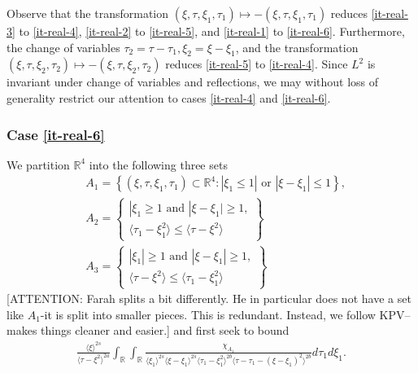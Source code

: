 \documentclass[12pt,reqno]{amsart}
\numberwithin{equation}{section}  %
\numberwithin{figure}{section}
\newcommand{\rr}{\mathbb{R}}
\theoremstyle{plain}
\theoremstyle{definition}
\theoremstyle{remark}
\begin{document}
%
%
Observe that the transformation $(\xi, \tau, \xi_{1}, \tau_{1}) \mapsto -(\xi, \tau,
\xi_{1}, \tau_{1})$ reduces \eqref{it-real-3} to \eqref{it-real-4}, \eqref{it-real-2} to
\eqref{it-real-5}, and \eqref{it-real-1} to \eqref{it-real-6}. Furthermore, the change of
variables $\tau_{2} = \tau - \tau_{1}, \xi_{2} = \xi - \xi_{1}$, and the
transformation $(\xi, \tau, \xi_{2}, \tau_{2}) \mapsto - (\xi, \tau, \xi_{2},
\tau_{2})$ reduces \eqref{it-real-5} to \eqref{it-real-4}. Since $L^{2}$ is invariant
under change of variables and reflections, we may without loss of generality
restrict our attention to cases \eqref{it-real-4} and \eqref{it-real-6}.
 \subsubsection{Case \eqref{it-real-6}} 
\label{sssec:case-it-real-6}
We partition $\rr^{4}$ into the following three sets 
%
%
\begin{equation*}
\begin{split}
  & A_{1} = \left\{ (\xi, \tau, \xi_{1}, \tau_{1}) \subset \rr^{4}: |
  \xi_{1} \le 1 | \text{ or } | \xi - \xi_{1} | \le 1 \right\},
  \\
  & A_{2} = 
  \begin{Bmatrix}
    | \xi_{1} \ge 1 \text{ and } | \xi - \xi_{1} | \ge 1,
    \\
    \langle \tau_{1} - \xi_{1}^{2} \rangle  \le \langle \tau -
  \xi^{2} \rangle
\end{Bmatrix}
  \\
  & A_{3} = 
  \begin{Bmatrix}
    | \xi_{1} | \ge 1 \text{ and } | \xi - \xi_{1} | \ge 1,
    \\
    \langle \tau - \xi^{2} \rangle  \le \langle \tau_{1} - \xi_{1}^{2} \rangle 
  \end{Bmatrix}
\end{split}
\end{equation*}
%
[ATTENTION: Farah splits a bit differently. He in particular does not have a set
like $A_1$-it is split into smaller pieces. This is redundant. Instead,  we follow KPV--makes things cleaner and easier.]
and first seek to bound
%
%
\begin{equation}
  \label{case-1-region-1}
  \begin{split}
    \frac{ \langle \xi
    \rangle ^{2s}}{\langle \tau - \xi^{2} \rangle ^{2a}}
    \int_{\rr} \int_{\rr} \frac{\chi_{A_{1}}}{ \langle \xi_{1} \rangle ^{2s} \langle \xi-\xi_{1} \rangle ^{2s} 
    \langle \tau_{1} - \xi_{1}^{2} \rangle^{2b} \langle  \tau - \tau_{1} -
    (\xi - \xi_{1})^{2} \rangle^{2b} }
    d \tau_1 d \xi_{1}.
  \end{split}
\end{equation}
\end{document}
